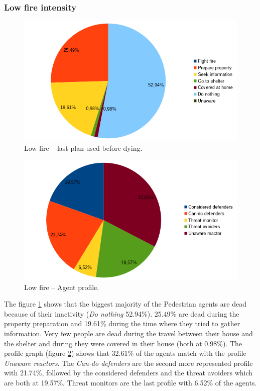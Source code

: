 \documentclass[12pt, a4paper]{memoir} %
\begin{document}
		\subsubsection{Low fire intensity}
		\begin{figure}
			\begin{center}
				\includegraphics[scale=0.6]{low-lastplan.png}
				\caption{\label{fig:low-lastplan}Low fire \--- last plan used before dying.}
			\end{center}
		\end{figure}

		\begin{figure}
			\begin{center}
				\includegraphics[scale=0.6]{low-profil.png}
				\caption{\label{fig:low-profil}Low fire \--- Agent profile.}
			\end{center}
		\end{figure}

		The figure \ref{fig:low-lastplan} shows that the biggest majority of the Pedestrian agents are dead because of their inactivity
		(\textit{Do nothing} 52.94\%). 25.49\% are dead during the property preparation and 19.61\% during the time where they tried to
		gather information. Very few people are dead during the travel between their house and the shelter and during they were
		covered in their house (both at 0.98\%).
		\newline
		The profile graph (figure \ref{fig:low-profil}) shows that 32.61\% of the agents match with the profile \textit{Unaware reactors}.
		The \textit{Can-do defenders} are the second more represented profile with 21.74\%, followed by the considered defenders and the threat avoiders which are both at 19.57\%.
		Threat monitors are the last profile with 6.52\% of the agents.
\end{document}
